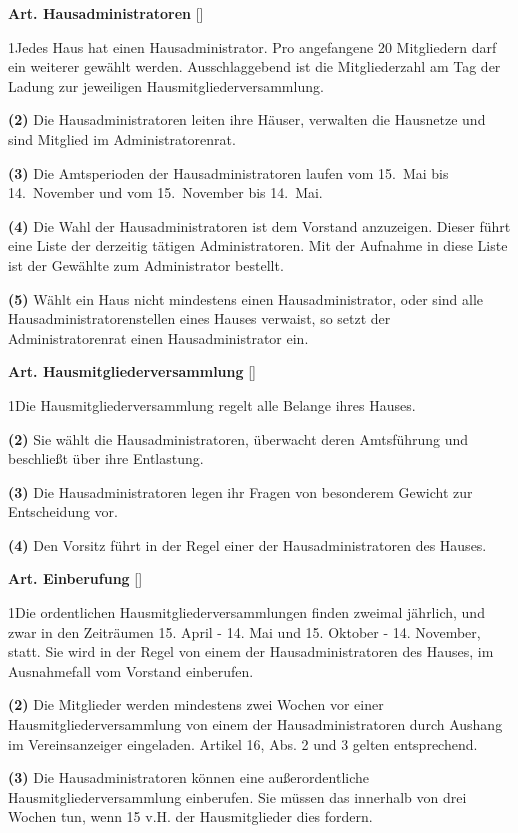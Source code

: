 \documentclass[12pt]{article}
\newcommand{\Satz}[2]{

\begin{samepage}
{\bf (#1)} #2
\end{samepage}
}
\newenvironment{Artikel}[2]{
\bigskip \centerline{{\bf Art. #1} [#2]}
\nopagebreak
}{
}
\begin{document}
\begin{Artikel}{19}{Hausadministratoren}

\Satz{1}{Jedes Haus hat einen Hausadministrator. Pro angefangene 20 Mitgliedern
darf ein weiterer gewählt werden. Ausschlaggebend ist die Mitgliederzahl am
Tag der Ladung zur jeweiligen Hausmitgliederversammlung.}

\Satz{2}{Die Hausadministratoren leiten ihre Häuser, verwalten die Hausnetze
und sind Mitglied im Administratorenrat.}

\Satz{3}{Die Amtsperioden der Hausadministratoren laufen vom \mbox{15. Mai} bis
\mbox{14. November} und vom \mbox{15. November} bis \mbox{14. Mai}.}

\Satz{4}{Die Wahl der Hausadministratoren ist dem Vorstand anzuzeigen.  Dieser
führt eine Liste der derzeitig tätigen Administratoren. Mit der Aufnahme in
diese Liste ist der Gewählte zum Administrator bestellt.}

\Satz{5}{Wählt ein Haus nicht mindestens einen Hausadministrator, oder sind
alle Hausadministratorenstellen eines Hauses verwaist, so setzt der
Administratorenrat einen Hausadministrator ein.}

\end{Artikel}

\begin{Artikel}{20}{Hausmitgliederversammlung}

\Satz{1}{Die Hausmitgliederversammlung regelt alle Belange ihres Hauses.}

\Satz{2}{Sie wählt die Hausadministratoren, überwacht deren Amtsführung und
beschließt über ihre Entlastung.}

\Satz{3}{Die Hausadministratoren legen ihr Fragen von besonderem Gewicht zur
Entscheidung vor.}

\Satz{4}{Den Vorsitz führt in der Regel einer der Hausadministratoren des
Hauses.}

\end{Artikel}

\begin{Artikel}{21}{Einberufung}

\Satz{1}{Die ordentlichen Hausmitgliederversammlungen finden zweimal jährlich,
und zwar in den Zeit\-räumen 15. April - 14. Mai und 15. Oktober - 14. November, statt. Sie
wird in der Regel von einem der Hausadministratoren des Hauses, im Ausnahmefall
vom Vorstand einberufen.}

\Satz{2}{Die Mitglieder werden mindestens zwei Wochen vor einer
Hausmitgliederversammlung von einem der Hausadministratoren durch Aushang im
Vereinsanzeiger eingeladen. Artikel 16, Abs. 2 und 3 gelten entsprechend.}

\Satz{3}{Die Hausadministratoren können eine außerordentliche
Hausmitgliederversammlung einberufen. Sie müssen das innerhalb von drei Wochen
tun, wenn 15 v.H. der Hausmitglieder dies fordern.}

\end{Artikel}
\end{document}
